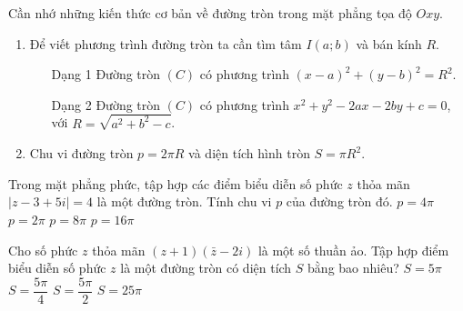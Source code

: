 \begin{note}
	Cần nhớ những kiến thức cơ bản về đường tròn trong mặt phẳng tọa độ $Oxy$.
	\begin{enumerate}
		\item Để viết phương trình đường tròn ta cần tìm tâm $I(a; b)$ và bán kính $R$. 
		\begin{itemize}
			\item[Dạng 1] Đường tròn $(C)$ có phương trình $(x-a)^2+(y-b)^2=R^2$.
			\item[Dạng 2] Đường tròn $(C)$ có phương trình $x^2+y^2-2ax-2by+c=0$, với $R=\sqrt{a^2+b^2-c}$.
		\end{itemize}
		\item Chu vi đường tròn $p=2\pi R$ và diện tích hình tròn $S=\pi R^2$.
	\end{enumerate}
	
\end{note}


\begin{ex}%
	Trong mặt phẳng phức, tập hợp các điểm biểu diễn số phức $z$ thỏa mãn $\left|z-3+5i\right|=4$ là một đường tròn. Tính chu vi $p$ của đường tròn đó.
	\choice
	{$p=4\pi$}
	{$p=2\pi$}
	{\True $p=8\pi$}
	{$p=16\pi$}
\end{ex}		


\begin{ex}%
	Cho số phức $z$ thỏa mãn $(z+1)(\bar{z}-2i)$ là một số thuần ảo. Tập hợp điểm biểu diễn số phức $z$ là một đường tròn có diện tích $S$ bằng bao nhiêu?
	\choice
	{$S=5\pi$}
	{\True $S=\dfrac{5\pi}{4}$}
	{$S=\dfrac{5\pi}{2}$}
	{$S=25\pi$}
\end{ex}	



